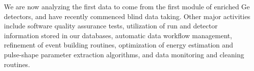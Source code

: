 We are now analyzing the first data to come from the first module of enriched Ge detectors, and have recently commenced blind data taking. Other major activities include software quality assurance tests, utilization of run and detector information stored in our databases, automatic data workflow management, refinement of event building routines, optimization of energy estimation and pulse-shape parameter extraction algorithms, and data monitoring and cleaning routines.

